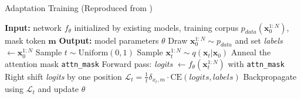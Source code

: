 \begin{algorithm}[H]
\footnotesize
\caption{Adaptation Training (Reproduced from \cite{gong_scaling_2025})}
\label{alg:training}
\begin{algorithmic}[1]
\State \textbf{Input:} network $f_{\theta}$ initialized by existing models, training corpus $p_{data}(\bm{x}_{0}^{1:N})$, mask token $\bm{m}$
\State \textbf{Output:} model parameters $\theta$
\Repeat
    \State Draw $\bm{x}_{0}^{1:N}\sim p_{data}$ and set \textit{labels} $\gets \bm{x}_{0}^{1:N}$
    \State Sample $t \sim \text{Uniform}(0,1)$
    \State Sample $\bm{x}_{t}^{1:N} \sim q(\bm{x}_{t}|\bm{x}_{0})$
    \State Anneal the attention mask \texttt{attn\_mask}
    \State Forward pass: \textit{logits} $\gets f_{\theta}(\bm{x}_{t}^{1:N})$ with \texttt{attn\_mask}
    \State Right shift \textit{logits} by one position 
    \State $\mathcal{L}_t = \frac{1}{t} \delta_{x_t, m} \cdot \text{CE}(\textit{logits}, \textit{labels})$
    \State Backpropagate using $\mathcal{L}_t$ and update $\theta$
\end{algorithmic}
\end{algorithm}